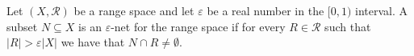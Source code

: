 \begin{definition}
	Let \((X, \mathcal{R})\) be a range space
	and
	let \(\varepsilon\) be a real number in the \([0,1)\) interval.
	A subset \(N \subseteq X\) is an \(\varepsilon\)-net for the range space if
	for every \(R \in \mathcal{R}\)
	such that \(| R | > \varepsilon | X |\)
	we have that \(N \cap R \neq \emptyset\).
\end{definition}
